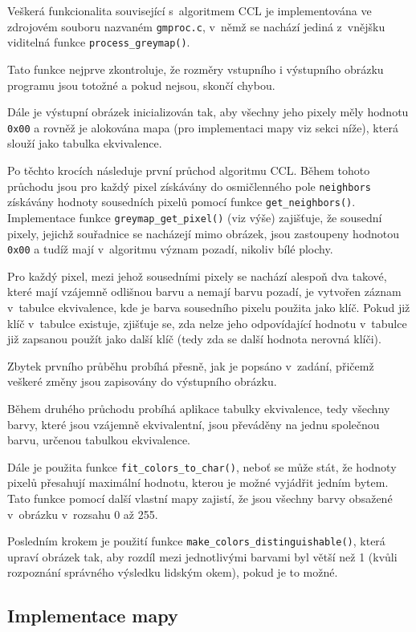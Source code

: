 Veškerá funkcionalita související s~algoritmem CCL je implementována ve zdrojovém souboru nazvaném \verb|gmproc.c|,
v~němž se nachází jediná z~vnějšku viditelná funkce \verb|process_greymap()|.

Tato funkce nejprve zkontroluje, že rozměry vstupního i výstupního obrázku programu jsou totožné a pokud nejsou,
skončí chybou.

Dále je výstupní obrázek inicializován tak, aby všechny jeho pixely měly hodnotu \verb|0x00| a rovněž je alokována mapa
(pro implementaci mapy viz sekci níže), která slouží jako tabulka ekvivalence.

Po těchto krocích následuje první průchod algoritmu CCL. Během tohoto průchodu jsou pro každý pixel získávány
do osmičlenného pole \verb|neighbors| získávány hodnoty sousedních pixelů pomocí funkce \verb|get_neighbors()|.
Implementace funkce \verb|greymap_get_pixel()| (viz výše) zajišťuje, že sousední pixely, jejichž souřadnice se nacházejí
mimo obrázek, jsou zastoupeny hodnotou \verb|0x00| a tudíž mají v~algoritmu význam pozadí, nikoliv bílé plochy.

Pro každý pixel, mezi jehož sousedními pixely se nachází alespoň dva takové, které mají vzájemně odlišnou barvu a nemají
barvu pozadí, je vytvořen záznam v~tabulce ekvivalence, kde je barva sousedního pixelu použita jako klíč. Pokud již klíč
v~tabulce existuje, zjišťuje se, zda nelze jeho odpovídající hodnotu v~tabulce již zapsanou použít jako další klíč (tedy
zda se další hodnota nerovná klíči).

Zbytek prvního průběhu probíhá přesně, jak je popsáno v~zadání, přičemž veškeré změny jsou zapisovány do výstupního
obrázku.

Během druhého průchodu probíhá aplikace tabulky ekvivalence, tedy všechny barvy, které jsou vzájemně ekvivalentní,
jsou převáděny na jednu společnou barvu, určenou tabulkou ekvivalence.

Dále je použita funkce \verb|fit_colors_to_char()|, neboť se může stát, že hodnoty pixelů přesahují maximální hodnotu,
kterou je možné vyjádřit jedním bytem. Tato funkce pomocí další vlastní mapy zajistí, že jsou všechny barvy obsažené
v~obrázku v~rozsahu 0 až 255.

Posledním krokem je použití funkce \verb|make_colors_distinguishable()|, která upraví obrázek tak, aby rozdíl mezi
jednotlivými barvami byl větší než 1 (kvůli rozpoznání správného výsledku lidským okem), pokud je to možné.


\subsection{Implementace mapy}

